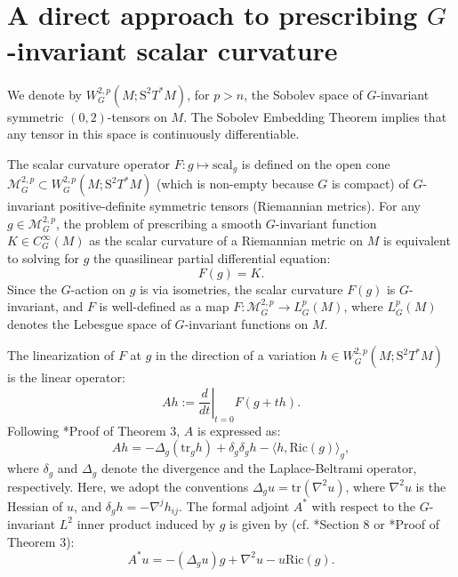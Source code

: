 \documentclass[12pt,a4paper]{amsart}
\theoremstyle{plain}
\theoremstyle{definition}
\theoremstyle{remark}
\newcommand{\ga}{\mathit{g}} %
\begin{document}
\ 


\ 


\section{A direct approach to prescribing \texorpdfstring{$G$}{G}-invariant scalar curvature}
\label{sec:direct}

We denote by $W_G^{2,p}(M; \mathrm{S}^2T^{\ast}M)$, for $p>n$, the Sobolev space of $G$-invariant symmetric $(0,2)$-tensors on $M$. The Sobolev Embedding Theorem implies that any tensor in this space is continuously differentiable. 

The scalar curvature operator $F\colon\ga\mapsto\mathrm{scal}_{\ga}$ is defined on the open cone $\mathcal{M}_G^{2,p} \subset W_G^{2,p}(M; \mathrm{S}^2T^{\ast}M)$ (which is non-empty because $G$ is compact) of $G$-invariant positive-definite symmetric tensors (Riemannian metrics). For any $\ga \in \mathcal{M}_G^{2,p}$, the problem of prescribing a smooth $G$-invariant function $K \in C^\infty_G(M)$ as the scalar curvature of a Riemannian metric on $M$ is equivalent to solving for $\ga$ the quasilinear partial differential equation:
\begin{equation}\label{eq:scalar_eqn}
    F(\ga) = K.
\end{equation}
Since the $G$-action on $\ga$ is via isometries, the scalar curvature $F(\ga)$ is $G$-invariant, and $F$ is well-defined as a map $F: \mathcal{M}_G^{2,p} \to L^p_G(M)$, where $L^p_G(M)$ denotes the Lebesgue space of $G$-invariant functions on $M$.

The linearization of $F$ at $\ga$ in the direction of a variation $h \in W_G^{2,p}(M; \mathrm{S}^2T^{\ast}M)$ is the linear operator:
\begin{equation}
    Ah := \left. \frac{d}{dt} \right|_{t=0} F(\ga + th).
\end{equation}
Following \cite{FISHERMarsden}*{Proof of Theorem 3}, $A$ is expressed as:
\begin{equation}
    Ah = -\Delta_{\ga} (\mathrm{tr}_{\ga} h) + \delta_{\ga} \delta_{\ga} h - \langle h, \mathrm{Ric}(\ga)\rangle_{\ga},
\end{equation}
where $\delta_{\ga}$ and $\Delta_{\ga}$ denote the divergence and the Laplace-Beltrami operator, respectively. Here, we adopt the conventions $\Delta_{\ga} u = \mathrm{tr}(\nabla^2 u)$, where $\nabla^2 u$ is the Hessian of $u$, and $\delta_{\ga} h = -\nabla^j h_{ij}$. The formal adjoint $A^*$ with respect to the $G$-invariant $L^2$ inner product induced by $\ga$ is given by (cf. \cite{Lichnerowicz1961}*{Section 8} or \cite{FISHERMarsden}*{Proof of Theorem 3}):
\begin{equation}\label{eq:adjoint}
    A^*u = -(\Delta_{\ga} u)\ga + \nabla^2 u - u \mathrm{Ric}(\ga).
\end{equation}
\end{document}
